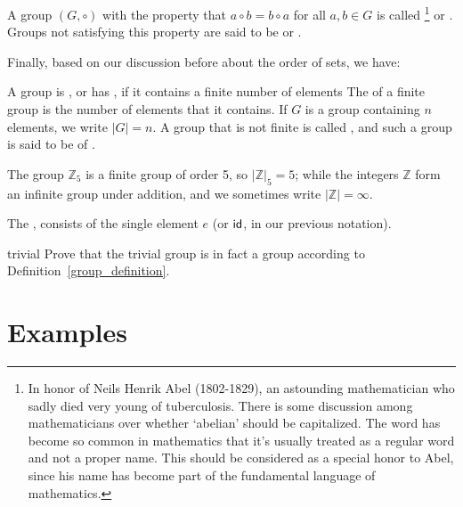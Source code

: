 \begin{defn} \label{abelian_group} 
A group $(G,\circ)$ with the property that $a \circ b = b \circ a$ for all $a, b \in G$ is called \footnote{In honor of Neils Henrik Abel (1802-1829), an astounding mathematician who sadly died very young of tuberculosis. There is some discussion among mathematicians over whether `abelian' should be capitalized. The word has become so common in mathematics that it's usually treated as a regular word and not a proper name. This should be considered as a special honor to Abel, since his name has become part of the fundamental language of mathematics.}  or .  Groups not satisfying this property are said to be   or . 
\end{defn}

Finally, based on our discussion before about the order of sets, we have:

\begin{defn} \label{group_order}
A group is , or has , if it contains a finite number of elements The 
of a finite group is the number of elements that it contains. If $G$
is a group containing $n$ elements, we write $|G| =
n$. A group that is not finite is called , and such a group is said to be of .
\end{defn} 

The group ${\mathbb Z}_5$ is a finite group of order
5, so $|{\mathbb Z}|_5=5$; while the integers ${\mathbb Z}$ form an infinite group under addition, and
we sometimes write $|{\mathbb Z}| = \infty$.

\begin{defn} \label{trivial_group}
The , consists of the single element $e$  (or ${\sf{i}d}$, in our previous notation).
\end{defn} 

\begin{exercise}{trivial}
Prove that the trivial group is in fact a group according to Definition~\ref{group_definition}.
\end{exercise}

\section{Examples}\label{Examples}

